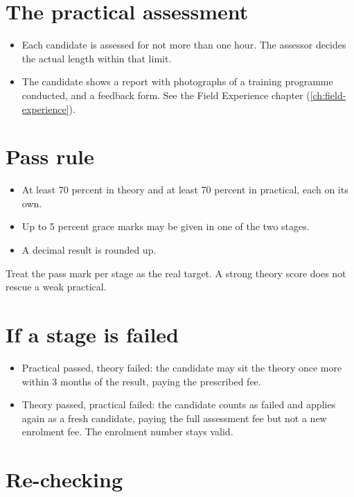 \section*{The practical assessment}

\begin{itemize}
\item Each candidate is assessed for not more than one hour. The assessor decides the actual length within that limit.
\item The candidate shows a report with photographs of a training programme conducted, and a feedback form. See the Field Experience chapter (\ref{ch:field-experience}).
\end{itemize}

\section*{Pass rule}

\begin{itemize}
\item At least 70 percent in theory and at least 70 percent in practical, each on its own.
\item Up to 5 percent grace marks may be given in one of the two stages.
\item A decimal result is rounded up.
\end{itemize}

Treat the pass mark per stage as the real target. A strong theory score does not rescue a weak practical.

\section*{If a stage is failed}

\begin{itemize}
\item Practical passed, theory failed: the candidate may sit the theory once more within 3 months of the result, paying the prescribed fee.
\item Theory passed, practical failed: the candidate counts as failed and applies again as a fresh candidate, paying the full assessment fee but not a new enrolment fee. The enrolment number stays valid.
\end{itemize}

\section*{Re-checking}

